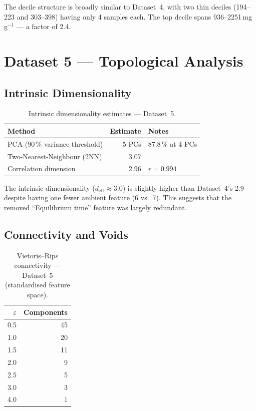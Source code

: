 \documentclass[12pt,a4paper]{article}
\begin{document}
The decile structure is broadly similar to Dataset~4, with two
thin deciles (194--223 and 303--398) having only 4 samples each.
The top decile spans 936--2251\,mg\,g$^{-1}$ — a factor of 2.4.

\section{Dataset 5 — Topological Analysis}
\label{sec:ds5_topology}

\subsection{Intrinsic Dimensionality}

\begin{table}[h]
\centering
\caption{Intrinsic dimensionality estimates — Dataset~5.}
\label{tab:ds5_intdim}
\begin{tabular}{lrl}
\toprule
Method & Estimate & Notes \\
\midrule
PCA (90\,\% variance threshold) & 5 PCs & 87.8\,\% at 4 PCs \\
Two-Nearest-Neighbour (2NN) & 3.07 & \\
Correlation dimension          & 2.96 & $r=0.994$ \\
\bottomrule
\end{tabular}
\end{table}

The intrinsic dimensionality ($d_\text{eff} \approx 3.0$) is slightly
higher than Dataset~4's 2.9 despite having one fewer ambient feature (6
vs.\ 7).  This suggests that the removed ``Equilibrium time'' feature
was largely redundant.

\subsection{Connectivity and Voids}

\begin{table}[h]
\centering
\caption{Vietoris--Rips connectivity — Dataset~5 (standardised feature space).}
\label{tab:ds5_connectivity}
\begin{tabular}{rr}
\toprule
$\varepsilon$ & Components \\
\midrule
0.5  & 45 \\
1.0  & 20 \\
1.5  & 11 \\
2.0  &  9 \\
2.5  &  5 \\
3.0  &  3 \\
4.0  &  1 \\
\bottomrule
\end{tabular}
\end{table}
\end{document}
